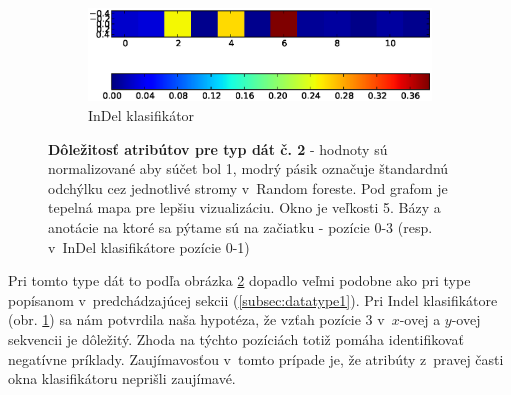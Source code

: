 \begin{figure}[htp]
\begin{subfigure}[t]{0.4\textwidth}
                \includegraphics[width=\textwidth]{images/clf_fi/randomforest_cmp_5_indel_heatmap}
                \caption{InDel klasifikátor}
                \label{fig:datatype2-i}
        \end{subfigure}
        \caption[Dôležitosť atribútov pre typ dát č. 2]{
        \textbf{Dôležitosť atribútov pre typ dát č. 2} - hodnoty sú normalizované aby súčet bol 1, modrý pásik označuje štandardnú odchýlku cez jednotlivé stromy v~Random foreste.
        Pod grafom je tepelná mapa pre lepšiu vizualizáciu. Okno je veľkosti 5. Bázy a anotácie na ktoré sa pýtame sú na začiatku - pozície 0-3 (resp. v~InDel klasifikátore pozície 0-1)
        }
        \label{fig:datatype2}
\end{figure}


Pri tomto type dát to podľa obrázka \ref{fig:datatype2} dopadlo veľmi podobne ako pri type popísanom v~predchádzajúcej sekcii (\ref{subsec:datatype1}).
Pri Indel klasifikátore (obr. \ref{fig:datatype2-i}) sa nám potvrdila naša hypotéza, že vzťah pozície 3 v~$x$-ovej a $y$-ovej sekvencii je dôležitý.
Zhoda na týchto pozíciách totiž pomáha identifikovať negatívne príklady.
Zaujímavosťou v~tomto prípade je, že atribúty z~pravej časti okna klasifikátoru neprišli zaujímavé.

